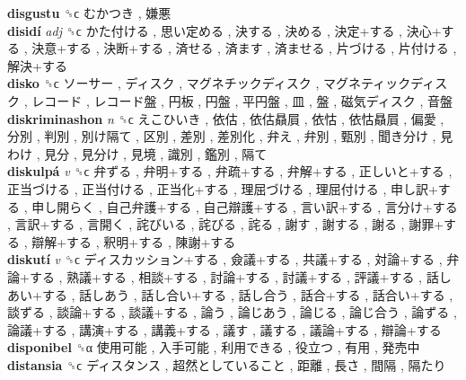 \textbf{disgustu} ␝ϲ   むかつき ,  嫌悪   \\
\textbf{disidí} \emph{adj}  ␝ϲ   かた付ける ,  思い定める ,  決する ,  決める ,  決定+する ,  決心+する ,  決意+する ,  決断+する ,  済せる ,  済ます ,  済ませる ,  片づける ,  片付ける ,  解決+する   \\
\textbf{disko} ␝ϲ   ソーサー ,  ディスク ,  マグネチックディスク ,  マグネティックディスク ,  レコード ,  レコード盤 ,  円板 ,  円盤 ,  平円盤 ,  皿 ,  盤 ,  磁気ディスク ,  音盤   \\
\textbf{diskriminashon} \emph{n}  ␝ϲ   えこひいき ,  依估 ,  依估贔屓 ,  依怙 ,  依怙贔屓 ,  偏愛 ,  分別 ,  判別 ,  別け隔て ,  区別 ,  差別 ,  差別化 ,  弁え ,  弁別 ,  甄別 ,  聞き分け ,  見わけ ,  見分 ,  見分け ,  見境 ,  識別 ,  鑑別 ,  隔て   \\
\textbf{diskulpá} \emph{v}  ␝ϲ   弁ずる ,  弁明+する ,  弁疏+する ,  弁解+する ,  正しいと+する ,  正当づける ,  正当付ける ,  正当化+する ,  理屈づける ,  理屈付ける ,  申し訳+する ,  申し開らく ,  自己弁護+する ,  自己辯護+する ,  言い訳+する ,  言分け+する ,  言訳+する ,  言開く ,  詫びいる ,  詫びる ,  詫る ,  謝す ,  謝する ,  謝る ,  謝罪+する ,  辯解+する ,  釈明+する ,  陳謝+する   \\
\textbf{diskutí} \emph{v}  ␝ϲ   ディスカッション+する ,  僉議+する ,  共議+する ,  対論+する ,  弁論+する ,  熟議+する ,  相談+する ,  討論+する ,  討議+する ,  評議+する ,  話しあい+する ,  話しあう ,  話し合い+する ,  話し合う ,  話合+する ,  話合い+する ,  談ずる ,  談論+する ,  談議+する ,  論う ,  論じあう ,  論じる ,  論じ合う ,  論ずる ,  論議+する ,  講演+する ,  講義+する ,  議す ,  議する ,  議論+する ,  辯論+する   \\
\textbf{disponibel} ␝α   使用可能 ,  入手可能 ,  利用できる ,  役立つ ,  有用 ,  発売中   \\
\textbf{distansia} ␝ϲ   ディスタンス ,  超然としていること ,  距離 ,  長さ ,  間隔 ,  隔たり   \\

